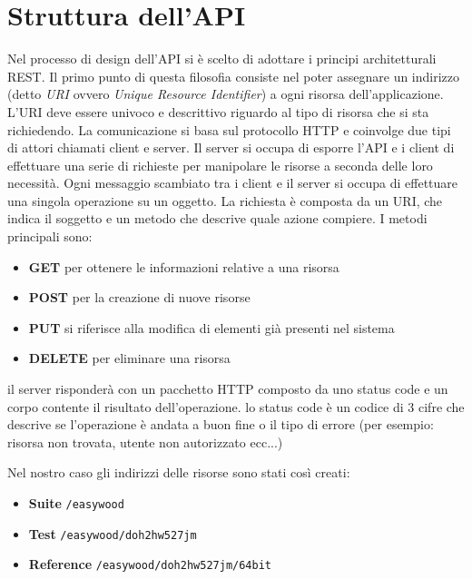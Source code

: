     \section{Struttura dell'API}
        Nel processo di design dell'API si è scelto di adottare i principi architetturali REST.
        Il primo punto di questa filosofia consiste nel poter assegnare un indirizzo (detto \textit{URI} ovvero \textit{Unique Resource Identifier}) a ogni risorsa dell'applicazione.
        L'URI deve essere univoco e descrittivo riguardo al tipo di risorsa che si sta richiedendo.
        La comunicazione si basa sul protocollo HTTP e coinvolge due tipi di attori chiamati client e server.
        Il server si occupa di esporre l'API e i client di effettuare una serie di richieste per manipolare le risorse a seconda delle loro necessità.
        Ogni messaggio scambiato tra i client e il server si occupa di effettuare una singola operazione su un oggetto.
        La richiesta è composta da un URI, che  indica il soggetto e un metodo che descrive quale azione compiere.
        I metodi principali sono:
        
        \begin{itemize}
            \item \textbf{GET} per ottenere le informazioni relative a una risorsa
            \item \textbf{POST} per la creazione di nuove risorse

            \item \textbf{PUT} si riferisce alla modifica di elementi già presenti nel sistema
            \item \textbf{DELETE} per eliminare una risorsa
        \end{itemize}
        
        il server risponderà con un pacchetto HTTP composto da uno status code e un corpo contente il risultato dell'operazione.
        lo status code è un codice di 3 cifre che descrive se l'operazione è andata a buon fine o il tipo di errore (per esempio: risorsa non trovata, utente non autorizzato ecc...)
        
        Nel nostro caso gli indirizzi delle risorse sono stati così creati: 
        \begin{itemize}
            \item \textbf{Suite} \verb|/easywood|
            \item \textbf{Test} \verb|/easywood/doh2hw527jm|
            \item \textbf{Reference} \verb|/easywood/doh2hw527jm/64bit|
        \end{itemize}
        
